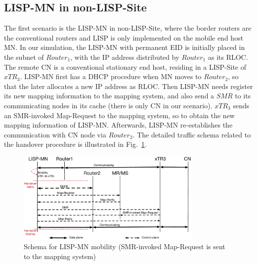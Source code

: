 \subsection{LISP-MN in non-LISP-Site}
\label{sec:ns3_analysis_lispmn}
The first scenario is the LISP-MN in non-LISP-Site, where the border routers are the conventional routers and LISP is only implemented on the mobile end host MN. In our simulation, the LISP-MN with permanent EID is initially placed in the subnet of $Router_1$, with the IP address distributed by $Router_1$ as its RLOC. The remote CN is a conventional stationary end host, residing in a LISP-Site of $xTR_3$. %
LISP-MN first has a DHCP procedure when MN moves to $Router_2$, so that the later allocates a new IP address as RLOC. Then LISP-MN needs register its new mapping information to the mapping system, and also send a $SMR$ to its communicating nodes in its cache (there is only CN in our scenario). $xTR_3$ sends an SMR-invoked Map-Request to the mapping system, so to obtain the new mapping information of LISP-MN. Afterwards, LISP-MN re-establishes  the communication with CN node via $Router_2$. The detailed traffic schema related to the handover procedure is illustrated in Fig.~\ref{sim_schema_LISPMN}.  %
\begin{figure}[!t]
	\centering
	\includegraphics[width=0.8\textwidth]{Pics/Mobility_LISPMN_schema_SMR_simplify}
	\caption{Schema for LISP-MN mobility (SMR-invoked Map-Request is sent to the mapping system)}
	\label{sim_schema_LISPMN}
\end{figure}

